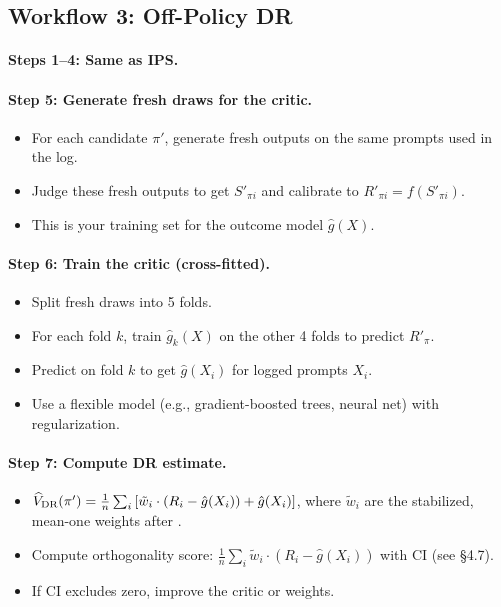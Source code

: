 \subsection{Workflow 3: Off-Policy DR}

\paragraph{Steps 1--4: Same as IPS.}

\paragraph{Step 5: Generate fresh draws for the critic.}
\begin{itemize}
\item For each candidate $\pi'$, generate fresh outputs on the same prompts used in the log.
\item Judge these fresh outputs to get $S'_{\pi i}$ and calibrate to $R'_{\pi i} = f(S'_{\pi i})$.
\item This is your training set for the outcome model $\hat{g}(X)$.
\end{itemize}

\paragraph{Step 6: Train the critic (cross-fitted).}
\begin{itemize}
\item Split fresh draws into 5 folds.
\item For each fold $k$, train $\hat{g}_k(X)$ on the other 4 folds to predict $R'_{\pi}$.
\item Predict on fold $k$ to get $\hat{g}(X_i)$ for logged prompts $X_i$.
\item Use a flexible model (e.g., gradient-boosted trees, neural net) with regularization.
\end{itemize}

\paragraph{Step 7: Compute DR estimate.}
\begin{itemize}
\item $\widehat{V}_{\text{DR}}(\pi') = \frac{1}{n} \sum_i \left[ \tilde{w}_i \cdot (R_i - \hat{g}(X_i)) + \hat{g}(X_i) \right]$, where $\tilde{w}_i$ are the stabilized, mean-one weights after \simcal.
\item Compute orthogonality score: $\frac{1}{n} \sum_i \tilde{w}_i \cdot (R_i - \hat{g}(X_i))$ with CI (see §4.7).
\item If CI excludes zero, improve the critic or weights.
\end{itemize}

